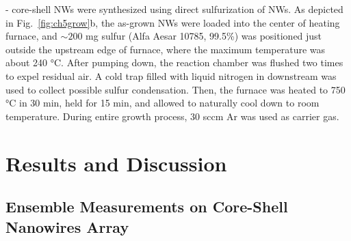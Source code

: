 - core-shell NWs were synthesized using direct sulfurization of  NWs. As depicted in Fig.~\ref{fig:ch5grow}b, the as-grown  NWs were loaded into the center of heating furnace, and $\sim200$ mg sulfur (Alfa Aesar 10785, 99.5\%) was positioned just outside the upstream edge of furnace, where the maximum temperature was about 240 \si{\degreeCelsius}. After pumping down, the reaction chamber was flushed two times to expel residual air. A cold trap filled with liquid nitrogen in downstream was used to collect possible sulfur condensation. Then, the furnace was heated to 750 \si{\degreeCelsius} in 30 min, held for 15 min, and allowed to naturally cool down to room temperature. During entire growth process, 30 sccm Ar was used as carrier gas.

\section{Results and Discussion}
\subsection{Ensemble Measurements on Core-Shell Nanowires Array}

